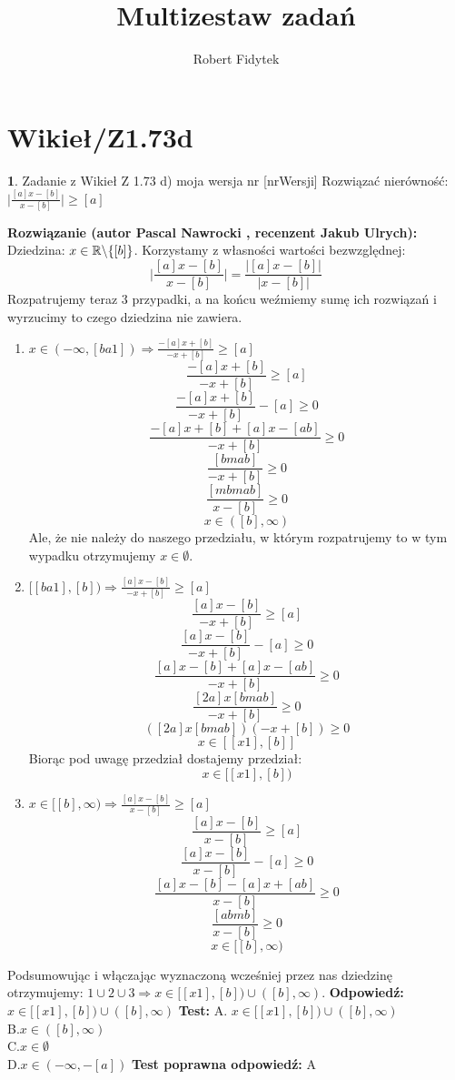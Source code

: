 \documentclass[12pt, a4paper]{article}
\title{Multizestaw zadań}
\author{Robert Fidytek}
\date{}
\theoremstyle{definition} %
\newtheorem{zad}{}
\newcommand{\kategoria}[1]{\section{#1}} %
\newcommand{\zadStart}[1]{\begin{zad}#1\newline} %
\newcommand{\zadStop}{\end{zad}}   %
\newcommand{\rozwStart}[2]{\noindent \textbf{Rozwiązanie (autor #1 , recenzent #2): }\newline} %
\newcommand{\rozwStop}{\newline}                                            %
\newcommand{\odpStart}{\noindent \textbf{Odpowiedź:}\newline}    %
\newcommand{\odpStop}{\newline}                                             %
\newcommand{\testStart}{\noindent \textbf{Test:}\newline} %
\newcommand{\testStop}{\newline} %
\newcommand{\kluczStart}{\noindent \textbf{Test poprawna odpowiedź:}\newline} %
\newcommand{\kluczStop}{\newline} %
\begin{document}
\maketitle


\kategoria{Wikieł/Z1.73d}
\zadStart{Zadanie z Wikieł Z 1.73 d) moja wersja nr [nrWersji]}
Rozwiązać nierówność: $\big|\frac{[a]x-[b]}{x-[b]}\big|\geq[a]$
\zadStop
\rozwStart{Pascal Nawrocki}{Jakub Ulrych}
Dziedzina: $x\in\mathbb{R}\symbol{92}\{[b]\}$.
Korzystamy z własności wartości bezwzględnej:
$$\bigg|\frac{[a]x-[b]}{x-[b]}\bigg|=\frac{|[a]x-[b]|}{|x-[b]|}$$
Rozpatrujemy teraz 3 przypadki, a na końcu weźmiemy sumę ich rozwiązań i wyrzucimy to czego dziedzina nie zawiera.

\begin{enumerate}
\item $x\in(-\infty,[ba1])\Rightarrow\frac{-[a]x+[b]}{-x+[b]}\geq[a]$
$$\frac{-[a]x+[b]}{-x+[b]}\geq[a]$$
$$\frac{-[a]x+[b]}{-x+[b]}-[a]\geq0$$
$$\frac{-[a]x+[b]+[a]x-[ab]}{-x+[b]}\geq0$$
$$\frac{[bmab]}{-x+[b]}\geq0$$
$$\frac{[mbmab]}{x-[b]}\geq0$$
$$x\in([b],\infty)$$
Ale, że nie należy do naszego przedziału, w którym rozpatrujemy to w tym wypadku otrzymujemy $x\in\emptyset$.

\item $ [[ba1],[b])\Rightarrow\frac{[a]x-[b]}{-x+[b]}\geq[a]$
$$\frac{[a]x-[b]}{-x+[b]}\geq[a]$$
$$\frac{[a]x-[b]}{-x+[b]}-[a]\geq0$$
$$\frac{[a]x-[b]+[a]x-[ab]}{-x+[b]}\geq0$$
$$\frac{[2a]x[bmab]}{-x+[b]}\geq0$$
$$([2a]x[bmab])(-x+[b])\geq0$$
$$x\in[[x1],[b]]$$
Biorąc pod uwagę przedział dostajemy przedział:
$$x\in[[x1],[b])$$

\item $x\in[[b],\infty)\Rightarrow\frac{[a]x-[b]}{x-[b]}\geq[a]$
$$\frac{[a]x-[b]}{x-[b]}\geq[a]$$
$$\frac{[a]x-[b]}{x-[b]}-[a]\geq0$$
$$\frac{[a]x-[b]-[a]x+[ab]}{x-[b]}\geq0$$
$$\frac{[abmb]}{x-[b]}\geq0$$
$$x\in[[b],\infty)$$
\end{enumerate}
Podsumowując i włączając wyznaczoną wcześniej przez nas dziedzinę otrzymujemy: $1\cup2\cup3\Rightarrow x\in[[x1],[b])\cup([b],\infty)$.
\rozwStop
\odpStart
$x\in[[x1],[b])\cup([b],\infty)$
\odpStop
\testStart
A. $x\in[[x1],[b])\cup([b],\infty)$
\\
B.$x\in([b],\infty)$
\\
C.$x\in\emptyset$
\\
D.$x\in(-\infty,-[a])$
\testStop
\kluczStart
A
\kluczStop
\end{document}
